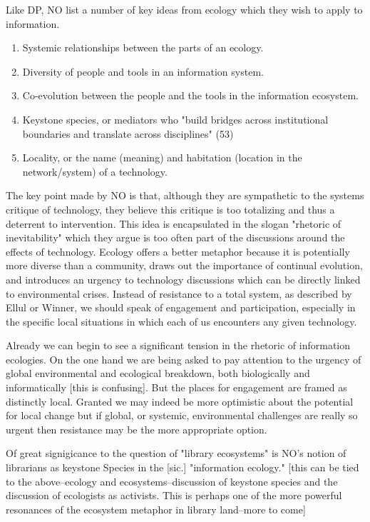 Like DP, NO list a number of key ideas from ecology which they wish to apply to information.

\begin{enumerate}
\item Systemic relationships between the parts of an ecology.
\item Diversity of people and tools in an information system.
\item Co-evolution between the people and the tools in the information ecosystem.
\item Keystone species, or mediators who "build bridges across institutional boundaries and translate across disciplines" (53)
\item Locality, or the name (meaning) and habitation (location in the network/system) of a technology.
\end{enumerate}

The key point made by NO is that, although they are sympathetic to the systems critique of technology, they believe this critique is too totalizing and thus a deterrent to intervention. This idea is encapsulated in the slogan "rhetoric of inevitability" which they argue is too often part of the discussions around the effects of technology. Ecology offers a better metaphor because it is potentially more diverse than a community, draws out the importance of continual evolution, and introduces an urgency to technology discussions which can be directly linked to environmental crises. Instead of resistance to a total system, as described by Ellul or Winner, we should speak of engagement and participation, especially in the specific local situations in which each of us encounters any given technology.

Already we can begin to see a significant tension in the rhetoric of information ecologies. On the one hand we are being asked to pay attention to the urgency of global environmental and ecological breakdown, both biologically and informatically [this is confusing]. But the places for engagement are framed as distinctly local. Granted we may indeed be more optimistic about the potential for local change but if global, or systemic, environmental challenges are really so urgent then resistance may be the more appropriate option.

Of great signigicance to the question of "library ecosystems" is NO's notion of librarians as keystone Species in the [sic.] "information ecology." [this can be tied to the above--ecology and ecosystems--discussion of keystone species and the discussion of ecologists as activists. This is perhaps one of the more powerful resonances of the ecosystem metaphor in library land--more to come]